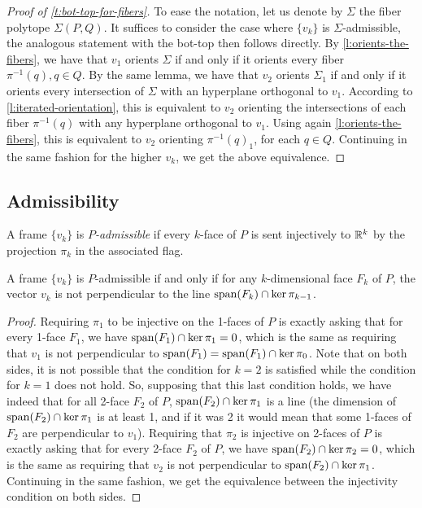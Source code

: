 \begin{proof}[Proof of \cref{t:bot-top-for-fibers}]
	To ease the notation, let us denote by $\Sigma$ the fiber polytope $\Sigma(P,Q)$.
	It suffices to consider the case where $\{v_k\}$ is $\Sigma$-admissible, the analogous statement with the bot-top then follows directly.
	By \cref{l:orients-the-fibers}, we have that $v_1$ orients $\Sigma$ if and only if it orients every fiber $\pi^{-1}(q), q \in Q$.
	By the same lemma, we have that $v_2$ orients $\Sigma_1$ if and only if it orients every intersection of $\Sigma$ with an hyperplane orthogonal to $v_1$.
	According to \cref{l:iterated-orientation}, this is equivalent to $v_2$ orienting the intersections of each fiber $\pi^{-1}(q)$ with any hyperplane orthogonal to $v_1$.
	Using again \cref{l:orients-the-fibers}, this is equivalent to $v_2$ orienting $\pi^{-1}(q)_1$, for each $q \in Q$.
	Continuing in the same fashion for the higher $v_k$, we get the above equivalence.
\end{proof}

\subsection{Admissibility}

A frame $\{v_k\}$ is \emph{$P$-admissible} if every $k$-face of $P$ is sent injectively to $\mathbb{R}^k$ by the projection $\pi_k$ in the associated flag.

\begin{lemma} \label{l:P-admissible}
	A frame $\{v_k\}$ is $P$-admissible if and only if for any $k$-dimensional face $F_k$ of $P$, the vector $v_k$ is not perpendicular to the line $\operatorname{\mathrm{span}}(F_k) \cap \ker \pi_{k-1}$.
\end{lemma}

\begin{proof}
	Requiring $\pi_1$ to be injective on the 1-faces of $P$ is exactly asking that for every 1-face $F_1$, we have $\operatorname{\mathrm{span}}(F_1)\cap \ker \pi_1=0$, which is the same as requiring that $v_1$ is not perpendicular to $\operatorname{\mathrm{span}}(F_1)=\operatorname{\mathrm{span}}(F_1)\cap \ker \pi_0$.
	Note that on both sides, it is not possible that the condition for $k=2$ is satisfied while the condition for $k=1$ does not hold.
	So, supposing that this last condition holds, we have indeed that for all 2-face $F_2$ of $P$, $\operatorname{\mathrm{span}}(F_2)\cap \ker \pi_1$ is a line (the dimension of $\operatorname{\mathrm{span}}(F_2)\cap \ker \pi_1$ is at least 1, and if it was 2 it would mean that some 1-faces of $F_2$ are perpendicular to $v_1$).
	Requiring that $\pi_2$ is injective on 2-faces of $P$ is exactly asking that for every 2-face $F_2$ of $P$, we have $\operatorname{\mathrm{span}}(F_2)\cap \ker \pi_2=0$, which is the same as requiring that $v_2$ is not perpendicular to $\operatorname{\mathrm{span}}(F_2)\cap \ker \pi_1$.
	Continuing in the same fashion, we get the equivalence between the injectivity condition on both sides.
\end{proof}

